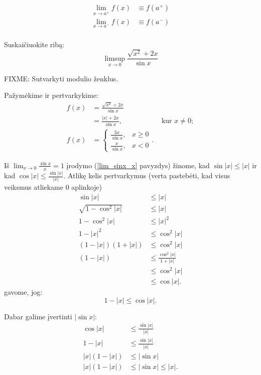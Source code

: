 \begin{notation}
  \begin{align*}
    \lim _{x \to a^{+}} f(x) &\equiv f(a^{+}) \\
    \lim _{x \to a^{-}} f(x) &\equiv f(a^{-}) \\
  \end{align*}
\end{notation}

\begin{exmp}
  Suskaičiuokite ribą:
  \begin{equation*}
    \limsup _{x \to 0} \frac{\sqrt{x^2} + 2x}{\sin x}
  \end{equation*}

  FIXME: Sutvarkyti modulio ženklus.

  Pažymėkime ir pertvarkykime:
  \begin{align*}
    f(x) 
    &= \frac{\sqrt{x^2} + 2x}{\sin x} \\
    &= \frac{|x| + 2x}{\sin x}, & \text{ kur } x \neq 0; \\
    f(x) 
    &=
    \begin{cases}
      \frac{3x}{\sin x}, & x \geq 0 \\
      \frac{x}{\sin x}, & x < 0
    \end{cases}.
  \end{align*}

  Iš $\lim _{x \to 0} \frac{\sin x}{x} = 1$ įrodymo 
  (\ref{lim_sinx_x} pavyzdys) žinome, kad $\sin |x| \leq |x|$ ir 
  kad $\cos |x| \leq \frac{\sin |x|}{|x|}$. Atlikę
  kelis pertvarkymus (verta pastebėti, kad visus veiksmus atliekame
  0 aplinkoje)
  \begin{align*}
    \sin |x| &\leq |x| \\
    \sqrt{1 - \cos ^{2} |x|} &\leq |x| \\
    1 - \cos^{2} |x| &\leq |x|^{2} \\
    1 - |x|^{2} &\leq \cos^{2} |x| \\
    (1 - |x|)(1 + |x|) &\leq \cos^{2} |x| \\
    (1 - |x|) &\leq \frac{\cos^{2} |x|}{1 + |x|} \\
      &\leq \cos^{2} |x| \\
      &\leq \cos |x|.
  \end{align*}
  gavome, jog:
  \begin{equation*}
    1 - |x| \leq \cos |x|.
  \end{equation*}

  Dabar galime įvertinti $|\sin x|$:
  \begin{align*}
    \cos |x| &\leq \frac{\sin |x|}{|x|}  \\
    1 - |x| &\leq \frac{\sin |x|}{|x|} \\
    |x|(1 - |x|) &\leq |\sin x| \\
    |x|(1 - |x|) &\leq |\sin x| \leq |x|.
  \end{align*}


\end{exmp}
